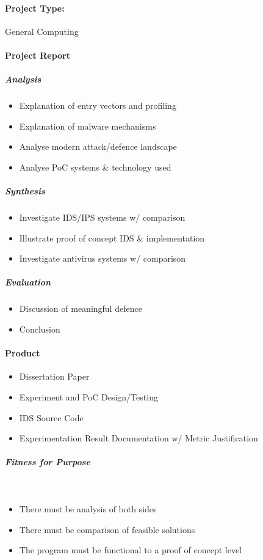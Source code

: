 \paragraph{Project Type:} General Computing

\paragraph{Project Report}
\subparagraph{Analysis}
\begin{itemize}
	\item Explanation of entry vectors and profiling
	\item Explanation of malware mechanisms
	\item Analyse modern attack/defence landscape
	\item Analyse PoC systems & technology used
\end{itemize}

\subparagraph{Synthesis}
\begin{itemize}
	\item Investigate IDS/IPS systems w/ comparison
	\item Illustrate proof of concept IDS & implementation
	\item Investigate antivirus systems w/ comparison
\end{itemize}

\subparagraph{Evaluation}
\begin{itemize}
	\item Discussion of meaningful defence
	\item Conclusion
\end{itemize}

\paragraph{Product}
\begin{itemize}
	\item Dissertation Paper
	\item Experiment and PoC Design/Testing
	\item IDS Source Code
	\item Experimentation Result Documentation w/ Metric Justification
\end{itemize}

\subparagraph{Fitness for Purpose}~
\begin{itemize}
	\item There must be analysis of both sides
	\item There must be comparison of feasible solutions
	\item The program must be functional to a proof of concept level
\end{itemize}

